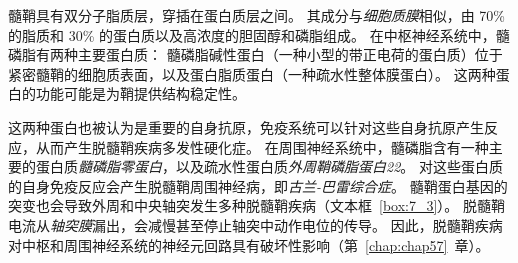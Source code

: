 髓鞘具有双分子脂质层，穿插在蛋白质层之间。
其成分与\textit{细胞质膜}相似，由 70\% 的脂质和 30\% 的蛋白质以及高浓度的胆固醇和磷脂组成。
在中枢神经系统中，髓磷脂有两种主要蛋白质：
髓磷脂碱性蛋白（一种小型的带正电荷的蛋白质）位于紧密髓鞘的细胞质表面，以及蛋白脂质蛋白（一种疏水性整体膜蛋白）。
这两种蛋白的功能可能是为鞘提供结构稳定性。



这两种蛋白也被认为是重要的自身抗原，免疫系统可以针对这些自身抗原产生反应，从而产生脱髓鞘疾病多发性硬化症。 
在周围神经系统中，髓磷脂含有一种主要的蛋白质\textit{髓磷脂零蛋白}，以及疏水性蛋白质\textit{外周鞘磷脂蛋白22}。
对这些蛋白质的自身免疫反应会产生脱髓鞘周围神经病，即\textit{古兰-巴雷综合症}。
髓鞘蛋白基因的突变也会导致外周和中央轴突发生多种脱髓鞘疾病（文本框~\ref{box:7_3}）。
脱髓鞘电流从\textit{轴突膜}漏出，会减慢甚至停止轴突中动作电位的传导。
因此，脱髓鞘疾病对中枢和周围神经系统的神经元回路具有破坏性影响（第~\ref{chap:chap57}~章）。


